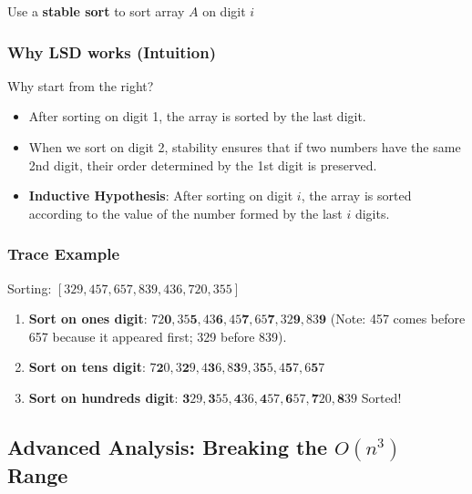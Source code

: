 \documentclass[12pt]{article}
\theoremstyle{blueplain}
\theoremstyle{bluedef}
\theoremstyle{blueremark}
\begin{document}
\begin{algorithm}
    \caption{Radix Sort}\label{alg:radixSort}
    \begin{algorithmic}[1]
        \State Use a \textbf{stable sort} to sort array $A$ on digit $i$
        \EndFor
        \EndProcedure
    \end{algorithmic}
\end{algorithm}

\subsubsection{Why LSD works (Intuition)}
Why start from the right?
\begin{itemize}
    \item After sorting on digit 1, the array is sorted by the last digit.
    \item When we sort on digit 2, stability ensures that if two numbers have the same 2nd digit, their order determined by the 1st digit is preserved.
    \item \textbf{Inductive Hypothesis}: After sorting on digit $i$, the array is sorted according to the value of the number formed by the last $i$ digits.
\end{itemize}

\subsubsection{Trace Example}
Sorting: $[329, 457, 657, 839, 436, 720, 355]$
\begin{enumerate}
    \item \textbf{Sort on ones digit}:
          $72\mathbf{0}, 35\mathbf{5}, 43\mathbf{6}, 45\mathbf{7}, 65\mathbf{7}, 32\mathbf{9}, 83\mathbf{9}$
          (Note: 457 comes before 657 because it appeared first; 329 before 839).
    \item \textbf{Sort on tens digit}:
          $7\mathbf{2}0, 3\mathbf{2}9, 4\mathbf{3}6, 8\mathbf{3}9, 3\mathbf{5}5, 4\mathbf{5}7, 6\mathbf{5}7$
    \item \textbf{Sort on hundreds digit}:
          $\mathbf{3}29, \mathbf{3}55, \mathbf{4}36, \mathbf{4}57, \mathbf{6}57, \mathbf{7}20, \mathbf{8}39$
          Sorted!
\end{enumerate}

\subsection{Advanced Analysis: Breaking the $O(n^3)$ Range}
\end{document}
